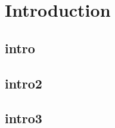 \setchapterpreamble[u]{\margintoc}
\chapter{Introduction}

\section{intro}
\section{intro2}
\section{intro3}


\pagebreak
